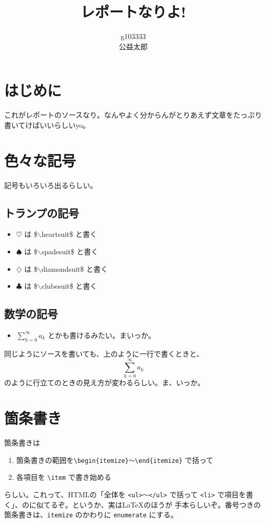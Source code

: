 \documentclass[uplatex]{jsarticle}
\title{レポートなりよ!}
\author{g103333\\公益太郎}
\begin{document}
\maketitle
\section{はじめに}

これがレポートのソースなり。なんやよく分からんがとりあえず文章をたっぷり
書いてけばいいらしいyo。

 \section{色々な記号}
 
 記号もいろいろ出るらしい。

  \subsection{トランプの記号}

  \begin{itemize}
   \item $\heartsuit$ は \$$\backslash$heartsuit\$ と書く
   \item $\spadesuit$ は \$$\backslash$spadesuit\$ と書く
   \item $\diamondsuit$ は \$$\backslash$diamondsuit\$ と書く
   \item $\clubsuit$ は \$$\backslash$clubesuit\$ と書く
  \end{itemize}

  \subsection{数学の記号}

  \begin{itemize}
   \item $\sum_{k=0}^{\infty}a_{k}$ とかも書けるみたい。まいっか。
  \end{itemize}
  同じようにソースを書いても、上のように一行で書くときと、
  \begin{equation}
   \sum_{k=0}^{\infty}a_{k}
  \end{equation}
  のように行立てのときの見え方が変わるらしい。ま、いっか。

 \section{箇条書き}

 箇条書きは
 \begin{enumerate}
  \item 箇条書きの範囲を\verb|\begin{itemize}〜\end{itemize}| で括って
  \item 各項目を \verb|\item| で書き始める
 \end{enumerate}
 らしい。これって、HTMLの「全体を \verb|<ul>〜</ul>| で括って 
 \verb|<li>| で項目を書く」、のに似てるぞ。というか、実は\LaTeX のほうが
 手本らしいぞ。番号つきの箇条書きは、\verb|itemize| のかわりに
 \verb|enumerate| にする。
\end{document}
